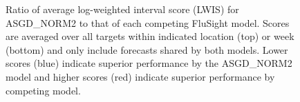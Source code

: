 \begin{figure}[hbt!]
\begin{adjustwidth}{-1.2cm}{-1.5cm}
    \centering
    \end{adjustwidth}
    \caption{Ratio of average log-weighted interval score (LWIS) for ASGD\_NORM2 
    to that of each competing FluSight model. Scores are averaged
    over all targets within indicated location (top) or week (bottom) and 
    only include forecasts shared by both models. Lower scores (blue) indicate
    superior performance by the ASGD\_NORM2 model and higher scores (red)
    indicate superior performance by competing model.}
    \label{fig:state_and_date_lwis}
    
\end{figure}



